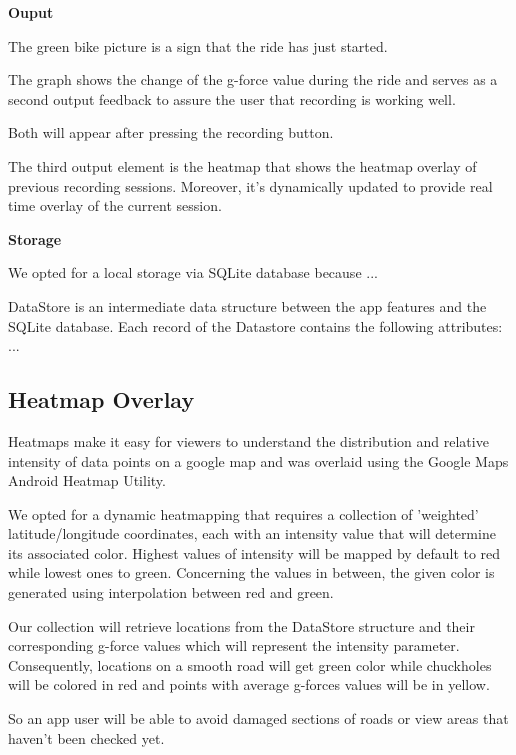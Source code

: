 \documentclass[10pt,a4paper]{article} %
\begin{document}
    \textbf{Ouput}
    
    The green bike picture is a sign that the ride has just started.
    
    The graph shows the change of the g-force value during the ride and serves as a second output feedback to assure the user that recording is working well.
    
    Both will appear after pressing the recording button.
    
    The third output element is the heatmap that shows the heatmap overlay of previous recording sessions. Moreover, it's dynamically updated to provide real time overlay of the current session.
    
    
    \textbf{Storage}
    
    We opted for a local storage via SQLite database because ...
    
    DataStore is an intermediate data structure between the app features and the SQLite database. Each record of the Datastore contains the following attributes: ...
    
    
    
    
    
    
    
    \subsection{ Heatmap Overlay}
    
    Heatmaps make it easy for viewers to understand the distribution and relative intensity of data points on a google map and was overlaid using the Google Maps Android Heatmap Utility.
    
    We opted for a dynamic heatmapping that requires a collection of 'weighted' latitude/longitude coordinates, each with an intensity value that will determine its associated color.
    Highest values of intensity will be mapped by default to red while lowest ones to green. Concerning the values in between, the given color is generated using interpolation between red and green. 
    
    Our collection will retrieve locations from the DataStore structure and their corresponding g-force values which will represent the intensity parameter. Consequently, locations on a smooth road will get green color while chuckholes will be colored in red and points with average g-forces values will be in yellow.
    
    So an app user will be able to avoid damaged sections of roads or view areas that haven't been checked yet.
     
\end{document}

